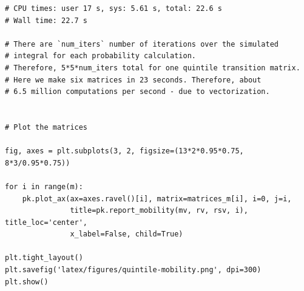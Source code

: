 \documentclass[a4paper,11pt]{article} %
\begin{document}
\begin{verbatim}
# CPU times: user 17 s, sys: 5.61 s, total: 22.6 s
# Wall time: 22.7 s

# There are `num_iters` number of iterations over the simulated 
# integral for each probability calculation.
# Therefore, 5*5*num_iters total for one quintile transition matrix. 
# Here we make six matrices in 23 seconds. Therefore, about 
# 6.5 million computations per second - due to vectorization. 


# Plot the matrices

fig, axes = plt.subplots(3, 2, figsize=(13*2*0.95*0.75, 8*3/0.95*0.75))

for i in range(m):
    pk.plot_ax(ax=axes.ravel()[i], matrix=matrices_m[i], i=0, j=i, 
               title=pk.report_mobility(mv, rv, rsv, i), title_loc='center', 
               x_label=False, child=True)

plt.tight_layout()
plt.savefig('latex/figures/quintile-mobility.png', dpi=300)
plt.show()


\end{verbatim}
\end{document}
